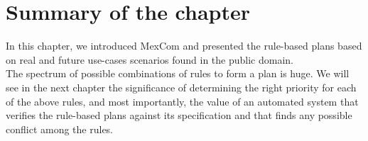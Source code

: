 \begin{table}[H]
\begin{center}
\end{center}
\caption{Limited Bolt-on Rules}
\label{limited_rules}
\end{table}
 
\section{Summary of the chapter}
\noindent
In this chapter, we introduced MexCom and presented the rule-based plans based on real and future use-cases scenarios found in the public domain. \\

The spectrum of possible combinations of rules to form a plan is huge. We will see in the next chapter the significance of determining the right priority for each of the above rules, and most importantly, the value of an automated system that verifies the rule-based plans against its specification and that finds any possible conflict among the rules. \\

\clearpage